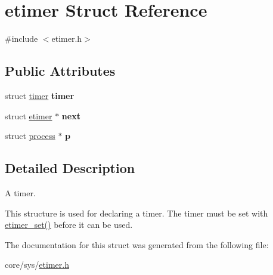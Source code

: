\hypertarget{structetimer}{\section{etimer Struct Reference}
\label{structetimer}
}


{\ttfamily \#include $<$etimer.\-h$>$}

\subsection*{Public Attributes}
\begin{DoxyCompactItemize}
\item 
\hypertarget{structetimer_a4a34942d742660840e3f8a5898ce9ed9}{struct \hyperlink{structtimer}{timer} {\bfseries timer}}\label{structetimer_a4a34942d742660840e3f8a5898ce9ed9}

\item 
\hypertarget{structetimer_ac9d5daf994eb722f1bbfd347e7415450}{struct \hyperlink{structetimer}{etimer} $\ast$ {\bfseries next}}\label{structetimer_ac9d5daf994eb722f1bbfd347e7415450}

\item 
\hypertarget{structetimer_a2b2f2c835d36cdd6bb4710e2dc2b825c}{struct \hyperlink{structprocess}{process} $\ast$ {\bfseries p}}\label{structetimer_a2b2f2c835d36cdd6bb4710e2dc2b825c}

\end{DoxyCompactItemize}


\subsection{Detailed Description}
A timer.

This structure is used for declaring a timer. The timer must be set with \hyperlink{group__etimer_gadb6c83643bbca82b614c50b27c586302}{etimer\-\_\-set()} before it can be used. 

The documentation for this struct was generated from the following file\-:\begin{DoxyCompactItemize}
\item 
core/sys/\hyperlink{etimer_8h}{etimer.\-h}\end{DoxyCompactItemize}
